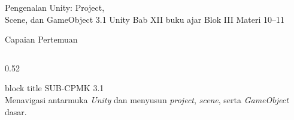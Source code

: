 \documentclass[aspectratio=169,10pt]{beamer}
\begin{document}
  {Pengenalan Unity: Project,\\ Scene, dan GameObject}
  {3.1}
  {Unity}
  {Bab XII buku ajar}
  {Blok III\,\textperiodcentered\,Materi 10--11}

\begin{frame}{Capaian Pertemuan}
\begin{columns}[T,onlytextwidth]
  \begin{column}{0.52\textwidth}
    \begin{beamercolorbox}[wd=\linewidth,sep=5pt,rounded=true]{block title}
      {\fontsize{6.8}{8}\selectfont\color{ubHead}SUB-CPMK 3.1}\\[2pt]
      {\footnotesize Menavigasi antarmuka \emph{Unity} dan menyusun
       \emph{project}, \emph{scene}, serta \emph{GameObject} dasar.}
    \end{beamercolorbox}
    \vspace{0.14cm}


\end{column}
\end{columns}
\end{frame}
\end{document}
